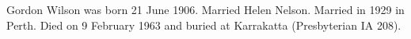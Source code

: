 
Gordon Wilson was born 21 June 1906.
Married Helen Nelson.
Married  in 1929 in Perth.\cite{WA_BMD_marriage_1929}
Died on 9 February 1963 and buried at Karrakatta (Presbyterian IA 208).\cite{Karrakatta_IA_208}
